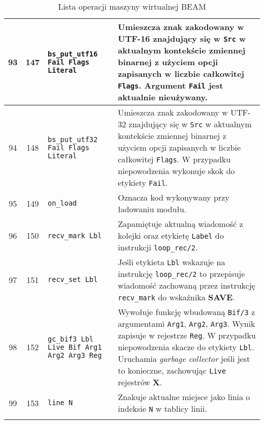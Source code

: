 \begin{longtable}{|c|c|p{5cm}|p{7cm}|}
\hline
93 & 147 & \texttt{bs\_put\_utf16 Fail Flags Literal} & Umieszcza znak zakodowany w UTF-16 znajdujący się w \texttt{Src} w aktualnym kontekście zmiennej binarnej z użyciem opcji zapisanych w liczbie całkowitej \texttt{Flags}. Argument \texttt{Fail} jest aktualnie nieużywany.\\
\hline
94 & 148 & \texttt{bs\_put\_utf32 Fail Flags Literal} &  Umieszcza znak zakodowany w UTF-32 znajdujący się w \texttt{Src} w aktualnym kontekście zmiennej binarnej z użyciem opcji zapisanych w liczbie całkowitej \texttt{Flags}. W przypadku niepowodzenia wykonuje skok do etykiety \texttt{Fail}. \\
\hline
95 & 149 & \texttt{on\_load} & Oznacza kod wykonywany przy ładowaniu modułu.\\
\hline
96 & 150 & \texttt{recv\_mark Lbl} & Zapamiętuje aktualną wiadomość z kolejki oraz etykietę \texttt{Label} do instrukcji \texttt{loop\_rec/2}.\\
\hline
97 & 151 & \texttt{recv\_set Lbl} & Jeśli etykieta \texttt{Lbl} wskazuje na instrukcję \texttt{loop\_rec/2} to przepisuje wiadomość zachowaną przez instrukcję \texttt{recv\_mark} do wskaźnika \textbf{SAVE}. \\
\hline
98 & 152 & \texttt{gc\_bif3 Lbl Live Bif Arg1 Arg2 Arg3 Reg} & Wywołuje funkcję wbudowaną \texttt{Bif/3} z argumentami \texttt{Arg1}, \texttt{Arg2}, \texttt{Arg3}. Wynik zapisuje w rejestrze \texttt{Reg}. W przypadku niepowodzenia skacze do etykiety \texttt{Lbl}. Uruchamia \emph{garbage collector} jeśli jest to konieczne, zachowując \texttt{Live} rejestrów \textbf{X}. \\
\hline
99 & 153 & \texttt{line N} & Znakuje aktualne miejsce jako linia o indeksie \texttt{N} w tablicy linii.\\
\hline


\caption{Lista operacji maszyny wirtualnej BEAM} 
\label{tab:ops} \\
\end{longtable}